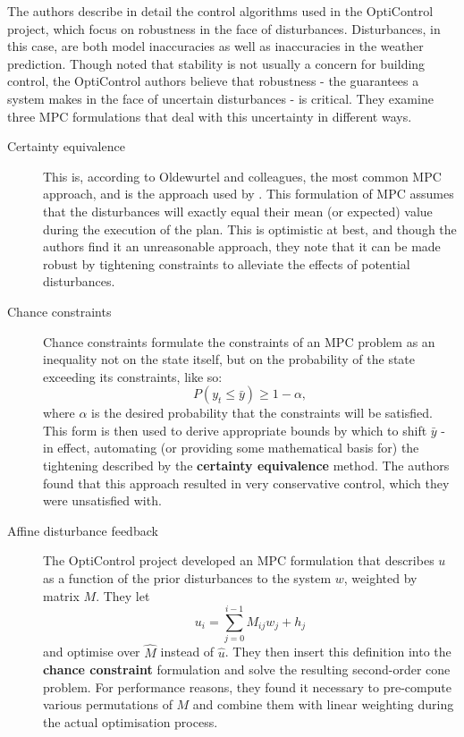 
The authors describe in detail the control algorithms used in the OptiControl project, which focus on robustness in the face of disturbances.
Disturbances, in this case, are both model inaccuracies as well as inaccuracies in the weather prediction.
Though \citeauthor{Siroky11} noted that stability is not usually a concern for building control, the OptiControl authors believe that robustness - the guarantees a system makes in the face of uncertain disturbances - is critical.
They examine three MPC formulations that deal with this uncertainty in different ways.

\begin{description}
   \item[Certainty equivalence]
      This is, according to Oldewurtel and colleagues, the most common MPC approach, and is the approach used by \citeauthor{Siroky11}.
      This formulation of MPC assumes that the disturbances will exactly equal their mean (or expected) value during the execution of the plan.
      This is optimistic at best, and though the authors find it an unreasonable approach, they note that it can be made robust by tightening constraints to alleviate the effects of potential disturbances.

   \item[Chance constraints]
      Chance constraints formulate the constraints of an MPC problem as an inequality not on the state itself, but on the probability of the state exceeding its constraints, like so:
      $$ P(y_t \leq \bar{y}) \geq 1 - \alpha, $$
      where $\alpha$ is the desired probability that the constraints will be satisfied.
      This form is then used to derive appropriate bounds by which to shift $\bar{y}$ - in effect, automating (or providing some mathematical basis for) the tightening described by the {\bf certainty equivalence} method.
      The authors found that this approach resulted in very conservative control, which they were unsatisfied with.

   \item[Affine disturbance feedback]
      The OptiControl project developed an MPC formulation that describes $u$ as a function of the prior disturbances to the system $w$, weighted by matrix $M$.
      They let
      $$ u_i = \sum _{j=0} ^{i-1} M_{ij} w_j + h_j $$
      and optimise over $\hat{M}$ instead of $\hat{u}$.
      They then insert this definition into the {\bf chance constraint} formulation and solve the resulting second-order cone problem.
      For performance reasons, they found it necessary to pre-compute various permutations of $M$ and combine them with linear weighting during the actual optimisation process.
\end{description}


